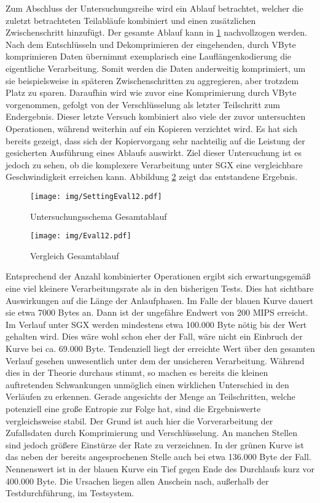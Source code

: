 Zum Abschluss der Untersuchungsreihe wird ein Ablauf betrachtet, welcher die zuletzt betrachteten Teilabläufe kombiniert und einen zusätzlichen Zwischenschritt hinzufügt. Der gesamte Ablauf kann in \ref{fig:settingeval12} nachvollzogen werden. Nach dem Entschlüsseln und Dekomprimieren der eingehenden, durch VByte komprimieren Daten übernimmt exemplarisch eine Lauflängenkodierung die eigentliche Verarbeitung. Somit werden die Daten anderweitig komprimiert, um sie beispielsweise in späteren Zwischenschritten zu aggregieren, aber trotzdem Platz zu sparen. Daraufhin wird wie zuvor eine Komprimierung durch VByte vorgenommen, gefolgt von der Verschlüsselung als letzter Teilschritt zum Endergebnis. Dieser letzte Versuch kombiniert also viele der zuvor untersuchten Operationen, während weiterhin auf ein Kopieren verzichtet wird. Es hat sich bereits gezeigt, dass sich der Kopiervorgang sehr nachteilig auf die Leistung der gesicherten Ausführung eines Ablaufs auswirkt. Ziel dieser Untersuchung ist es jedoch zu sehen, ob die komplexere Verarbeitung unter \ac{SGX} eine vergleichbare Geschwindigkeit erreichen kann. Abbildung \ref{fig:eval12} zeigt das entstandene Ergebnis.

\begin{figure}[h]
	\texttt{[image: img/SettingEval12.pdf]}
	\centering
	\caption{Untersuchungsschema Gesamtablauf}
	\label{fig:settingeval12}
\end{figure}

\begin{figure}[h]
	\texttt{[image: img/Eval12.pdf]}
	\centering
	\caption{Vergleich Gesamtablauf}
	\label{fig:eval12}
\end{figure}

Entsprechend der Anzahl kombinierter Operationen ergibt sich erwartungsgemäß eine viel kleinere Verarbeitungsrate als in den bisherigen Tests. Dies hat sichtbare Auswirkungen auf die Länge der Anlaufphasen. Im Falle der blauen Kurve dauert sie etwa 7000 Bytes an. Dann ist der ungefähre Endwert von 200 \ac{MIPS} erreicht. Im Verlauf unter \ac{SGX} werden mindestens etwa 100.000 Byte nötig bis der Wert gehalten wird. Dies wäre wohl schon eher der Fall, wäre nicht ein Einbruch der Kurve bei ca. 69.000 Byte. Tendenziell liegt der erreichte Wert über den gesamten Verlauf gesehen unwesentlich unter dem der unsicheren Verarbeitung. Während dies in der Theorie durchaus stimmt, so machen es bereits die kleinen auftretenden Schwankungen unmöglich einen wirklichen Unterschied in den Verläufen zu erkennen. Gerade angesichts der Menge an Teilschritten, welche potenziell eine große Entropie zur Folge hat, sind die Ergebniswerte vergleichsweise stabil. Der Grund ist auch hier die Vorverarbeitung der Zufallsdaten durch Komprimierung und Verschlüsselung. An manchen Stellen sind jedoch größere Einstürze der Rate zu verzeichnen. In der grünen Kurve ist das neben der bereits angesprochenen Stelle auch bei etwa 136.000 Byte der Fall. Nennenswert ist in der blauen Kurve ein Tief gegen Ende des Durchlaufs kurz vor 400.000 Byte. Die Ursachen liegen allen Anschein nach, außerhalb der Testdurchführung, im Testsystem.

